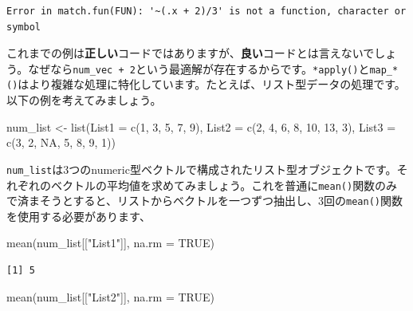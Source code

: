 \documentclass[
  a4paper,
  pandoc,
  ja=standard,
  jafont=haranoaji]{bxjsbook}
\newenvironment{Shaded}{\begin{snugshade}}{\end{snugshade}}
\newcommand{\AttributeTok}[1]{\textcolor[rgb]{0.00,0.48,0.65}{#1}}
\newcommand{\ConstantTok}[1]{\textcolor[rgb]{0.56,0.35,0.01}{#1}}
\newcommand{\DecValTok}[1]{\textcolor[rgb]{0.68,0.00,0.00}{#1}}
\newcommand{\FunctionTok}[1]{\textcolor[rgb]{0.28,0.35,0.67}{#1}}
\newcommand{\NormalTok}[1]{\textcolor[rgb]{0.00,0.48,0.65}{#1}}
\newcommand{\OtherTok}[1]{\textcolor[rgb]{0.00,0.48,0.65}{#1}}
\newcommand{\StringTok}[1]{\textcolor[rgb]{0.13,0.47,0.30}{#1}}
\begin{document}
\begin{verbatim}
Error in match.fun(FUN): '~(.x + 2)/3' is not a function, character or symbol
\end{verbatim}

これまでの例は\textbf{正しい}コードではありますが、\textbf{良い}コードとは言えないでしょう。なぜなら\texttt{num\_vec\ +\ 2}という最適解が存在するからです。\texttt{*apply()}と\texttt{map\_*()}はより複雑な処理に特化しています。たとえば、リスト型データの処理です。以下の例を考えてみましょう。

\begin{Shaded}
\begin{Highlighting}[numbers=left,,]
\NormalTok{num\_list }\OtherTok{\textless{}{-}} \FunctionTok{list}\NormalTok{(}\AttributeTok{List1 =} \FunctionTok{c}\NormalTok{(}\DecValTok{1}\NormalTok{, }\DecValTok{3}\NormalTok{, }\DecValTok{5}\NormalTok{, }\DecValTok{7}\NormalTok{, }\DecValTok{9}\NormalTok{),}
                 \AttributeTok{List2 =} \FunctionTok{c}\NormalTok{(}\DecValTok{2}\NormalTok{, }\DecValTok{4}\NormalTok{, }\DecValTok{6}\NormalTok{, }\DecValTok{8}\NormalTok{, }\DecValTok{10}\NormalTok{, }\DecValTok{13}\NormalTok{, }\DecValTok{3}\NormalTok{),}
                 \AttributeTok{List3 =} \FunctionTok{c}\NormalTok{(}\DecValTok{3}\NormalTok{, }\DecValTok{2}\NormalTok{, }\ConstantTok{NA}\NormalTok{, }\DecValTok{5}\NormalTok{, }\DecValTok{8}\NormalTok{, }\DecValTok{9}\NormalTok{, }\DecValTok{1}\NormalTok{))}
\end{Highlighting}
\end{Shaded}

\texttt{num\_list}は3つのnumeric型ベクトルで構成されたリスト型オブジェクトです。それぞれのベクトルの平均値を求めてみましょう。これを普通に\texttt{mean()}関数のみで済まそうとすると、リストからベクトルを一つずつ抽出し、3回の\texttt{mean()}関数を使用する必要があります、

\begin{Shaded}
\begin{Highlighting}[numbers=left,,]
\FunctionTok{mean}\NormalTok{(num\_list[[}\StringTok{"List1"}\NormalTok{]], }\AttributeTok{na.rm =} \ConstantTok{TRUE}\NormalTok{)}
\end{Highlighting}
\end{Shaded}

\begin{verbatim}
[1] 5
\end{verbatim}

\begin{Shaded}
\begin{Highlighting}[numbers=left,,]
\FunctionTok{mean}\NormalTok{(num\_list[[}\StringTok{"List2"}\NormalTok{]], }\AttributeTok{na.rm =} \ConstantTok{TRUE}\NormalTok{)}
\end{Highlighting}
\end{Shaded}
\end{document}
